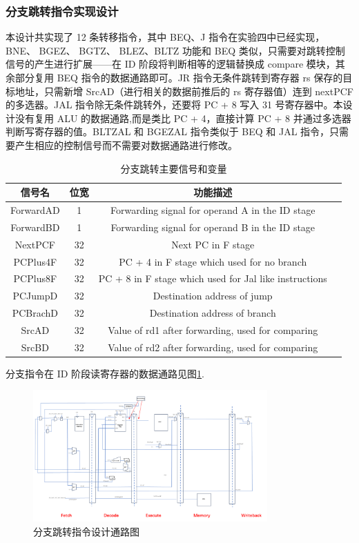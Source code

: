\subsubsection{分支跳转指令实现设计}

本设计共实现了 12 条转移指令，其中 BEQ、J 指令在实验四中已经实现，BNE、 BGEZ、 BGTZ、 BLEZ、BLTZ 功能和 BEQ 类似，只需要对跳转控制信号的产生进行扩展——在 ID 阶段将判断相等的逻辑替换成 compare 模块，其余部分复用 BEQ 指令的数据通路即可。JR 指令无条件跳转到寄存器 rs 保存的目标地址，只需新增 SrcAD（进行相关的数据前推后的 rs 寄存器值）连到 nextPCF 的多选器。JAL 指令除无条件跳转外，还要将 PC + 8 写入 31 号寄存器中。本设计没有复用 ALU 的数据通路,而是类比 PC + 4，直接计算 PC + 8 并通过多选器判断写寄存器的值。BLTZAL 和 BGEZAL 指令类似于 BEQ 和 JAL 指令，只需要产生相应的控制信号而不需要对数据通路进行修改。

\begin{table}[h]
\centering
\begin{tabular}{|c|c|c|c|}
\hline
\textbf{信号名}  & \textbf{位宽} & \textbf{功能描述}\\ \hline 
ForwardAD & 1 & Forwarding signal for operand A in the ID stage \\ \hline
ForwardBD & 1 & Forwarding signal for operand B in the ID stage \\ \hline
NextPCF & 32 & Next PC in F stage \\ \hline
PCPlus4F & 32 & PC + 4 in F stage which used for no branch \\ \hline
PCPlus8F &32 & PC + 8 in F stage which used for Jal like instructions \\ \hline
PCJumpD & 32 & Destination address of jump \\ \hline
PCBrachD & 32 & Destination address of branch \\ \hline
SrcAD & 32 & Value of rd1 after forwarding, used for comparing \\ \hline
SrcBD & 32 & Value of rd2 after forwarding, used for comparing \\ \hline
\end{tabular}
\caption{分支跳转主要信号和变量}
\label{分支跳转主要信号和变量}
\end{table}

分支指令在 ID 阶段读寄存器的数据通路见图\ref{fig:brach}.
\begin{figure}[htbp]
    \centering
    \includegraphics[width=0.8\textwidth]{image/branch.PNG}
    \caption{分支跳转指令设计通路图}
    \label{fig:brach}
\end{figure}

